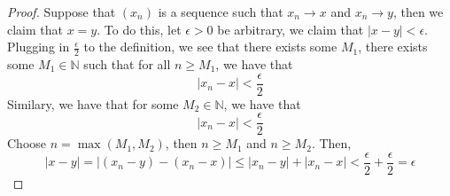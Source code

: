 \documentclass{article}
\newtheorem{one minute paper}[theorem]{One Minute Paper}
\begin{document}
\begin{proof}
    Suppose that $(x_n)$ is a sequence such that $x_n \rightarrow x$ and $x_n \rightarrow y$, then we claim that $x = y$. 
    To do this, let $\epsilon > 0$ be arbitrary, we claim that $|x - y| < \epsilon$. Plugging in $\frac{\epsilon}{2}$ to the definition, we see that there exists some $M_1$, there exists some $M_1 \in \mathbb{N}$ such that 
    for all $n \geq M_1$, we have that 
    \begin{equation}
        |x_n - x| < \frac{\epsilon}{2}
    \end{equation} 
    Similary, we have that for some $M_2 \in \mathbb{N}$, we have that 
    \begin{equation}
        |x_n - x| < \frac{\epsilon}{2}
    \end{equation}
    Choose $n = \max(M_1,M_2)$, then $n \geq M_1$ and $n \geq M_2$. Then,
    \begin{equation}
        |x-y| = |(x_n - y) - (x_n - x)| \leq |x_n - y| + |x_n - x| < \frac{\epsilon}{2} + \frac{\epsilon}{2} = \epsilon
    \end{equation}
\end{proof}
\end{document}
